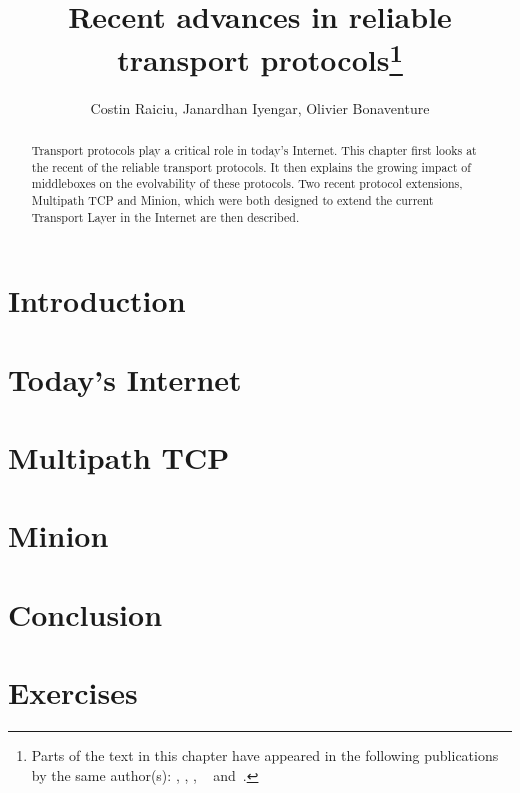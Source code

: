 \documentclass{article}
\title{Recent advances in reliable transport protocols\footnote{
Parts of the text in this chapter have appeared in the following
 publications by the same author(s): \cite{login}, \cite{mptcp-cc},
 \cite{raiciu2012hard}, ~\cite{nowlan12fitting} 
and~\cite{iyengar10minion}.}
}
\author{Costin Raiciu, Janardhan Iyengar, Olivier Bonaventure}
\date{}
\begin{document}
\maketitle

\begin{abstract}
Transport protocols play a critical role in today's Internet. This
chapter first looks at the recent of the reliable transport
protocols. It then explains the growing impact of middleboxes on the
evolvability of these protocols. 
Two recent protocol extensions,
Multipath TCP and Minion,
which were both designed to extend the current Transport Layer 
in the Internet
are then described.
\end{abstract}


\section{Introduction}




\section{Today's Internet}\label{section:today}





%

\section{Multipath TCP}\label{section:mptcp}




\section{Minion}\label{section:minion}





%

\section{Conclusion}\label{section:conclusion}







\appendix

\section{Exercises}


\end{document}
